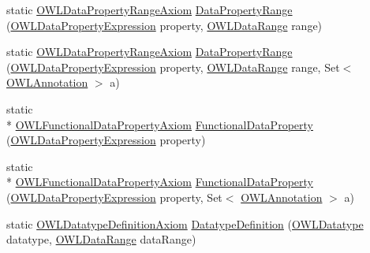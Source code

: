 \begin{DoxyCompactItemize}
\item 
static \hyperlink{interfaceorg_1_1semanticweb_1_1owlapi_1_1model_1_1_o_w_l_data_property_range_axiom}{O\-W\-L\-Data\-Property\-Range\-Axiom} \hyperlink{classorg_1_1semanticweb_1_1owlapi_1_1apibinding_1_1_o_w_l_functional_syntax_factory_a8de090422f434b57a5b337df97c569c5}{Data\-Property\-Range} (\hyperlink{interfaceorg_1_1semanticweb_1_1owlapi_1_1model_1_1_o_w_l_data_property_expression}{O\-W\-L\-Data\-Property\-Expression} property, \hyperlink{interfaceorg_1_1semanticweb_1_1owlapi_1_1model_1_1_o_w_l_data_range}{O\-W\-L\-Data\-Range} range)
\item 
static \hyperlink{interfaceorg_1_1semanticweb_1_1owlapi_1_1model_1_1_o_w_l_data_property_range_axiom}{O\-W\-L\-Data\-Property\-Range\-Axiom} \hyperlink{classorg_1_1semanticweb_1_1owlapi_1_1apibinding_1_1_o_w_l_functional_syntax_factory_a41a9cbfd53f9ea72d5450b4d5db4d365}{Data\-Property\-Range} (\hyperlink{interfaceorg_1_1semanticweb_1_1owlapi_1_1model_1_1_o_w_l_data_property_expression}{O\-W\-L\-Data\-Property\-Expression} property, \hyperlink{interfaceorg_1_1semanticweb_1_1owlapi_1_1model_1_1_o_w_l_data_range}{O\-W\-L\-Data\-Range} range, Set$<$ \hyperlink{interfaceorg_1_1semanticweb_1_1owlapi_1_1model_1_1_o_w_l_annotation}{O\-W\-L\-Annotation} $>$ a)
\item 
static \\*
\hyperlink{interfaceorg_1_1semanticweb_1_1owlapi_1_1model_1_1_o_w_l_functional_data_property_axiom}{O\-W\-L\-Functional\-Data\-Property\-Axiom} \hyperlink{classorg_1_1semanticweb_1_1owlapi_1_1apibinding_1_1_o_w_l_functional_syntax_factory_a2626ae5357a82148d1673ba8668d16bc}{Functional\-Data\-Property} (\hyperlink{interfaceorg_1_1semanticweb_1_1owlapi_1_1model_1_1_o_w_l_data_property_expression}{O\-W\-L\-Data\-Property\-Expression} property)
\item 
static \\*
\hyperlink{interfaceorg_1_1semanticweb_1_1owlapi_1_1model_1_1_o_w_l_functional_data_property_axiom}{O\-W\-L\-Functional\-Data\-Property\-Axiom} \hyperlink{classorg_1_1semanticweb_1_1owlapi_1_1apibinding_1_1_o_w_l_functional_syntax_factory_a3e4cfff8ec1ed2e4179755d0217496d9}{Functional\-Data\-Property} (\hyperlink{interfaceorg_1_1semanticweb_1_1owlapi_1_1model_1_1_o_w_l_data_property_expression}{O\-W\-L\-Data\-Property\-Expression} property, Set$<$ \hyperlink{interfaceorg_1_1semanticweb_1_1owlapi_1_1model_1_1_o_w_l_annotation}{O\-W\-L\-Annotation} $>$ a)
\item 
static \hyperlink{interfaceorg_1_1semanticweb_1_1owlapi_1_1model_1_1_o_w_l_datatype_definition_axiom}{O\-W\-L\-Datatype\-Definition\-Axiom} \hyperlink{classorg_1_1semanticweb_1_1owlapi_1_1apibinding_1_1_o_w_l_functional_syntax_factory_a785b1de408c31cbe3820e2a76e9e6eb5}{Datatype\-Definition} (\hyperlink{interfaceorg_1_1semanticweb_1_1owlapi_1_1model_1_1_o_w_l_datatype}{O\-W\-L\-Datatype} datatype, \hyperlink{interfaceorg_1_1semanticweb_1_1owlapi_1_1model_1_1_o_w_l_data_range}{O\-W\-L\-Data\-Range} data\-Range)

\end{DoxyCompactItemize}

